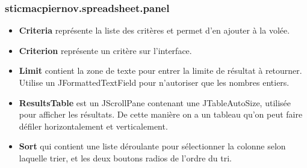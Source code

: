 \documentclass{article}
\begin{document}
\subsubsection{sticmacpiernov.spreadsheet.panel}
\begin{itemize}
  \item \textbf{Criteria} représente la liste des critères et permet d'en ajouter à la volée.
  \item \textbf{Criterion} représente un critère sur l'interface.
  \item \textbf{Limit} contient la zone de texte pour entrer la limite de résultat à retourner. Utilise un JFormattedTextField pour n'autoriser que les nombres entiers.
  \item \textbf{ResultsTable} est un JScrollPane contenant une JTableAutoSize, utilisée pour afficher les résultats. De cette manière on a un tableau qu'on peut faire défiler horizontalement et verticalement.
  \item \textbf{Sort} qui contient une liste déroulante pour sélectionner la colonne selon laquelle trier, et les deux boutons radios de l'ordre du tri.
\end{itemize}
\end{document}
